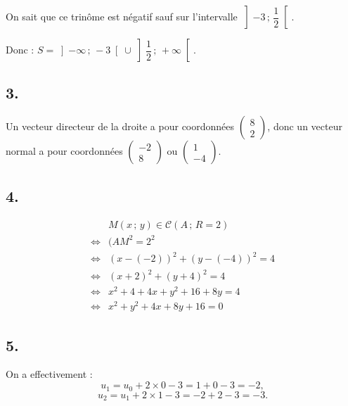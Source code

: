 \documentclass[10pt]{article}
\begin{document}
On sait que ce trinôme est négatif sauf sur l'intervalle \(\left] -3 \,;\, \dfrac{1}{2} \right[\).

Donc :
\(
S = \left] -\infty \,;\, -3 \right[ \cup \left] \dfrac{1}{2} \,;\, +\infty \right[.
\)

\subsection*{3.}

Un vecteur directeur de la droite a pour coordonnées \(\begin{pmatrix} 8 \\ 2 \end{pmatrix}\),
donc un vecteur normal a pour coordonnées \(\begin{pmatrix} -2 \\ 8 \end{pmatrix}\) ou \(\begin{pmatrix} 1 \\ -4 \end{pmatrix}\).

\subsection*{4.}

\begin{align*}
&M(x\,;\,y) \in \mathcal{C}(A\,;\,R = 2)\\
\iff& (AM^2 = 2^2\\
\iff &(x - (-2))^2 + (y - (-4))^2 = 4\\
\iff &(x + 2)^2 + (y + 4)^2 = 4\\
\iff &x^2 + 4 + 4x + y^2 + 16 + 8y = 4\\
\iff &x^2 + y^2 + 4x + 8y + 16 = 0
\end{align*}

\subsection*{5.}

On a effectivement :
\[
u_1 = u_0 + 2 \times 0 - 3 = 1 + 0 - 3 = -2,
\]
\[
u_2 = u_1 + 2 \times 1 - 3 = -2 + 2 - 3 = -3.
\]
\end{document}
